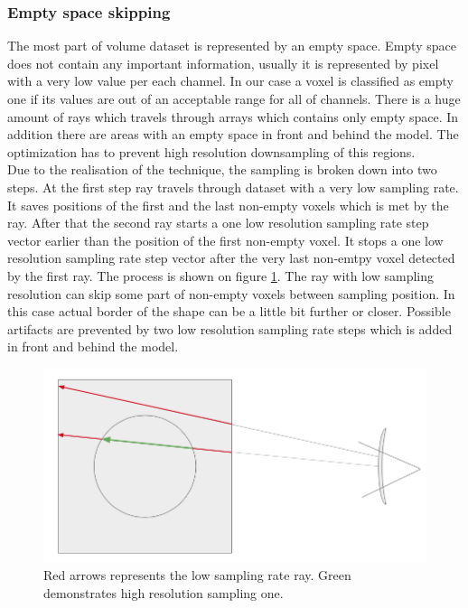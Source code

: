 \documentclass[twoside, english, 11pt]{report}
\begin{document}
\subsubsection{Empty space skipping}

The most part of volume dataset is represented by an empty space. Empty space does not contain any important information, usually it is represented by pixel with a very low value per each channel. In our case a voxel is classified as empty one if its values are out of an acceptable range for all of channels. There is a huge amount of rays which travels through arrays which contains only empty space. In addition there are areas with an empty space in front and behind the model. The optimization has to prevent high resolution downsampling of this regions.\\

Due to the realisation of the technique, the sampling is broken down into two steps. At the first step ray travels through dataset with a very low sampling rate. It saves positions of the first and the last non-empty voxels which is met by the ray. After that the second ray starts a one low resolution sampling rate step vector earlier than the position of the first non-empty voxel. It stops a one low resolution sampling rate step vector after the very last non-emtpy voxel detected by the first ray. The process is shown on figure \ref{fig:empty}. The ray with low sampling resolution can skip some part of non-empty voxels between sampling position. In this case actual border of the shape can be a little bit further or closer.  Possible artifacts are prevented by two low resolution sampling rate steps which is added in front and behind the model.\\

\begin{figure}[!h]
\centerline{\includegraphics[scale = 0.5]{img/empty}}
\caption{Red arrows represents the low sampling rate ray. Green demonstrates high resolution sampling one.\label{fig:empty}}
\end{figure}
\end{document}
